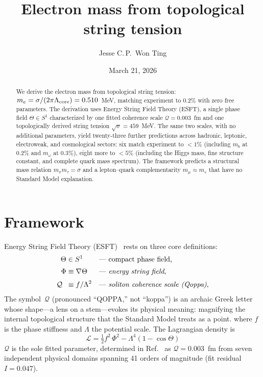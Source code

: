 ﻿\documentclass[aps,prl,twocolumn,superscriptaddress,showpacs]{revtex4-2}
\newcommand{\Qoppa}{\mathcal{Q}} %
\newcommand{\Phifield}{\Phi} %
\begin{document}
\title{Electron mass from topological string tension}

\author{Jesse C.\,P.\ Won Ting}

\date{March 21, 2026}

\begin{abstract}
We derive the electron mass from topological string tension:
$m_e = \sigma/(2\pi\Lambda_{\rm core}) = 0.510$~MeV, matching
experiment to 0.2\% with zero free parameters. The derivation
uses Energy String Field Theory (ESFT), a single phase field
$\Theta \in S^1$ characterized by one fitted coherence scale
$\Qoppa = 0.003$~fm and one topologically derived string
tension $\sqrt{\sigma} = 459$~MeV. The same two scales, with
no additional parameters, yield twenty-three further predictions
across hadronic, leptonic, electroweak, and cosmological sectors:
six match experiment to $<\!1\%$ (including $m_b$ at 0.2\% and
$m_\omega$ at 0.3\%), eight more to $<\!5\%$ (including the Higgs
mass, fine structure constant, and complete quark mass spectrum).
The framework predicts a structural mass relation $m_\pi m_\tau = \sigma$
and a lepton--quark complementarity $m_\mu \approx m_s$ that
have no Standard Model explanation.
\end{abstract}

\maketitle


\section{Framework}

Energy String Field Theory (ESFT)~\cite{PaperI,PaperII} rests on three
core definitions:
%
\begin{align}
 \Theta &\in S^1
 &&\text{--- compact phase field,}
 \label{eq:Theta}\\[2pt]
 \Phifield &\equiv \nabla\Theta
 &&\text{--- \emph{energy string field},}
 \label{eq:Phi}\\[2pt]
 \Qoppa\;\; &\equiv f/\Lambda^2
 &&\text{--- \emph{soliton coherence scale (Qoppa)},}
 \label{eq:qoppa}
\end{align}
The symbol~$\Qoppa$ (pronounced ``QOPPA,'' not ``koppa'') is an
archaic Greek letter whose shape---a lens on a stem---evokes its
physical meaning: magnifying the internal topological structure that
the Standard Model treats as a point.%
%
where $f$ is the phase stiffness and $\Lambda$ the potential scale.
The Lagrangian density is
\begin{equation}\label{eq:L}
 \boxed{\;\mathcal{L}
 = \tfrac{1}{2}f^2\,\Phifield^2
 - \Lambda^4\!\left(1-\cos\Theta\right)\;}
\end{equation}
$\Qoppa$ is the sole fitted parameter, determined in
Ref.~\cite{PaperI} as $\Qoppa = 0.003$~fm from seven independent
physical domains spanning 41 orders of magnitude (fit residual
$I = 0.047$).
\end{document}
